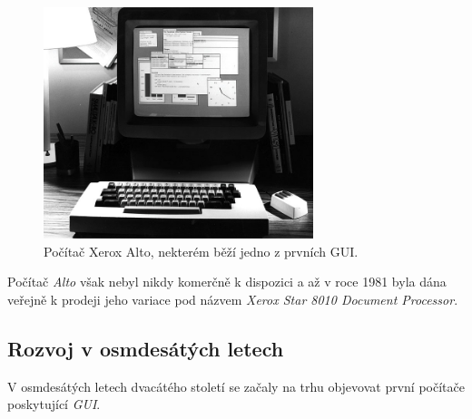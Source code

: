 \documentclass[11pt,twoside,a4paper]{book}
\begin{document}
\begin{figure}[!ht]
\begin{center}
  \includegraphics[width=0.7\textwidth]{altost2}
\caption{{\label{fig:altoGUI}}Počítač Xerox Alto, nekterém běží jedno z prvních GUI.}
\end{center}
\end{figure}
Počítač \textit{Alto} však nebyl nikdy komerčně k dispozici a až v roce 1981 byla dána veřejně k prodeji jeho variace pod názvem \textit{Xerox Star 8010 Document Processor}.

\subsection{Rozvoj v osmdesátých letech}
V osmdesátých letech dvacátého století se začaly na trhu objevovat první počítače poskytující \textit{GUI}.\cite{bib:history}
\end{document}
